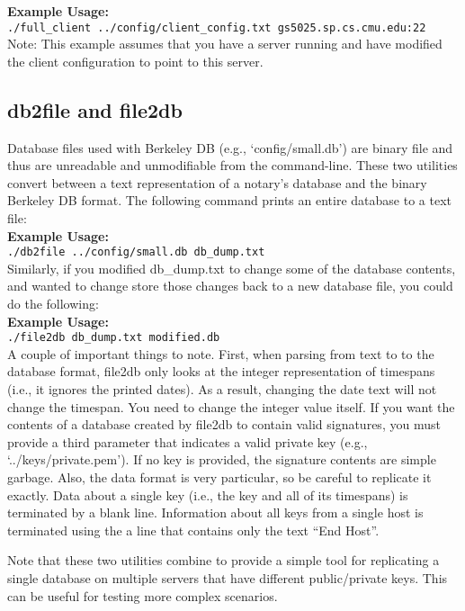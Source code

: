 \documentclass[pdftex,singlecolumn,11pt,letterpaper]{article}
\begin{document}
\noindent\textbf{Example Usage:} \\ 
\texttt{./full\_client ../config/client\_config.txt gs5025.sp.cs.cmu.edu:22} \\

\noindent Note: This example assumes that you have a server running and
have modified the client configuration to point to this server.  

\subsection{db2file and file2db}

Database files used with Berkeley DB (e.g., `config/small.db') are binary
file and thus are unreadable and unmodifiable from the command-line.  
These two utilities convert between a text representation of a notary's
database and the binary Berkeley DB format.  The following command 
prints an entire database to a text file: \\

\noindent\textbf{Example Usage:}  \\
\texttt{./db2file ../config/small.db db\_dump.txt} \\

Similarly, if you modified db\_dump.txt to change some of the database
contents, and wanted to change store those changes back to a new database
file, you could do the following: \\

\noindent\textbf{Example Usage:}  \\
\texttt{./file2db db\_dump.txt modified.db} \\

A couple of important things to note.  First, when parsing from text to 
to the database format, file2db only looks at the integer representation
of timespans (i.e., it ignores the printed dates).  As a result, changing
the date text will not change the timespan.  You need to change the 
integer value itself.  If you want the contents of a database created by
file2db to contain valid signatures, you must provide a third parameter 
that indicates a valid private key (e.g., `../keys/private.pem').  If
no key is provided, the signature contents are simple garbage.
Also, the data format is very particular, so be 
careful to replicate it exactly.  Data about a single key (i.e., the key
and all of its timespans) is terminated by a blank line.  Information 
about all keys from a single host is terminated using the a line that
contains only the text ``End Host''. 

Note that these two utilities combine to provide a simple tool for 
replicating a single database on multiple servers that have different 
public/private keys.  This can be useful for testing more complex 
scenarios.
\end{document}

